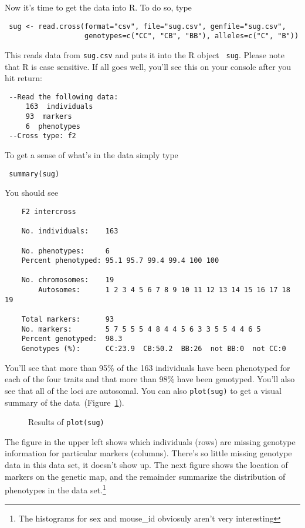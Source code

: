 Now it's time to get the data into R. To do so, type
\begin{verbatim}
 sug <- read.cross(format="csv", file="sug.csv", genfile="sug.csv",
                   genotypes=c("CC", "CB", "BB"), alleles=c("C", "B"))
\end{verbatim}
This reads data from {\tt sug.csv} and puts it into the R object {\tt
  sug}. Please note that R is case sensitive. If all goes well, you'll
see this on your console after you hit return:
\begin{verbatim}
 --Read the following data:
	 163  individuals
	 93  markers
	 6  phenotypes
 --Cross type: f2 
\end{verbatim}
To get a sense of what's in the data simply type
\begin{verbatim}
 summary(sug)
\end{verbatim}
You should see
\begin{verbatim}
    F2 intercross

    No. individuals:    163 

    No. phenotypes:     6 
    Percent phenotyped: 95.1 95.7 99.4 99.4 100 100 

    No. chromosomes:    19 
        Autosomes:      1 2 3 4 5 6 7 8 9 10 11 12 13 14 15 16 17 18 19 

    Total markers:      93 
    No. markers:        5 7 5 5 5 4 8 4 4 5 6 3 3 5 5 4 4 6 5 
    Percent genotyped:  98.3 
    Genotypes (%):      CC:23.9  CB:50.2  BB:26  not BB:0  not CC:0 
\end{verbatim}
You'll see that more than 95\% of the 163 individuals have been
phenotyped for each of the four traits and that more than 98\% have
been genotyped. You'll also see that all of the loci are
autosomal. You can also {\tt plot(sug)} to get a visual summary of the
data~(Figure~\ref{fig:rqtl-plot-sug}).

\begin{figure}
\begin{center}
\end{center}
\caption{Results of {\tt plot(sug)}}\label{fig:rqtl-plot-sug}
\end{figure}

The figure in the upper left shows which individuals (rows) are
missing genotype information for particular markers (columns). There's
so little missing genotype data in this data set, it doesn't show
up. The next figure shows the location of markers on the genetic map,
and the remainder summarize the distribution of phenotypes in the data
set.\footnote{The histograms for sex and mouse\_id obviosuly aren't
  very interesting}

